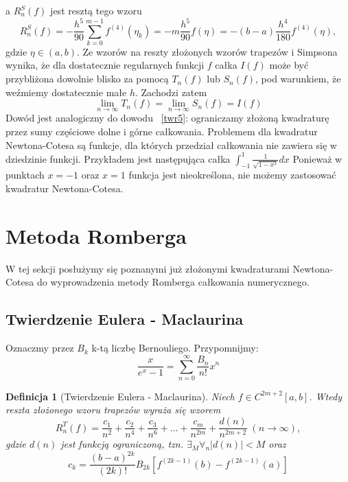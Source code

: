 \documentclass{article}
\newtheorem{defi}{Definicja}
\begin{document}
a $R_n^S(f)$ jest resztą tego wzoru
\begin{equation*}
	R_n^S(f) = - \frac{h^5}{90} \sum_{k = 0}^{m - 1} f^{(4)}(\eta_k) = - m \frac{h^5}{90} f(\eta) = -(b - a) \frac{h^4}{180} f^{(4)} (\eta),
\end{equation*}
gdzie $\eta \in (a,b)$.
\newline
\newline
Ze wzorów na reszty złożonych wzorów trapezów i Simpsona wynika, że dla dostatecznie regularnych funkcji $f$ całka $I(f)$ może być przybliżona
dowolnie blisko za pomocą $T_n(f)$ lub $S_n(f)$, pod warunkiem, że weźmiemy dostatecznie małe $h$. Zachodzi zatem
\begin{equation*}
	\lim_{n \to \infty} T_n(f) = \lim_{n \to \infty} S_n(f) = I(f)
\end{equation*}
Dowód jest analogiczny do dowodu ~\cref{twr5}: ograniczamy złożoną kwadraturę przez sumy częściowe dolne i górne całkowania.
\newline
\newline
Problemem dla kwadratur Newtona-Cotesa są funkcje, dla których przedział całkowania nie zawiera się w dziedzinie funkcji.
Przykładem jest następująca całka $\int_{-1}^1 \frac{1}{\sqrt{1 - x^2}} dx$ Ponieważ w punktach $x = -1$ oraz $x = 1$ funkcja jest nieokreślona,
nie możemy zastosować kwadratur Newtona-Cotesa.

\section{Metoda Romberga}
W tej sekcji posłużymy się poznanymi już złożonymi kwadraturami Newtona-Cotesa do wyprowadzenia metody Romberga
całkowania numerycznego.
\subsection{Twierdzenie Eulera - Maclaurina}
Oznaczmy przez $B_k$ k-tą liczbę Bernouliego. Przypomnijmy:
\begin{equation*}
	\frac{x}{e^x - 1} = \sum_{n = 0}^\infty \frac{B_n}{n!} x^n
\end{equation*}

\begin{defi}[Twierdzenie Eulera - Maclaurina]
	Niech $f \in C^{2m + 2}[a,b]$. Wtedy reszta złożonego wzoru trapezów wyraża się wzorem
	\begin{equation}
		R_n^T(f) = \frac{c_1}{n^2} + \frac{c_2}{n^4} + \frac{c_3}{n^6} + \ldots + \frac{c_m}{n^{2m}} + \frac{d(n)}{n^{2m + 2}} \; (n \to \infty),
	\end{equation}
	gdzie $d(n)$ jest funkcją ograniczoną, tzn. $\exists_{M} \forall_{n} |d(n)| < M$ oraz
	\begin{equation*}
		c_k = \frac{(b - a)^{2k}}{(2k)!} B_{2k} [f^{(2k - 1)}(b) - f^{(2k - 1)}(a)]
	\end{equation*}
\end{defi}
\end{document}
